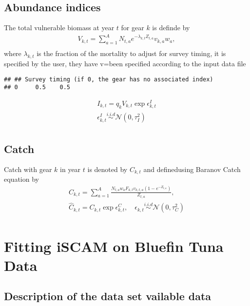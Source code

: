 \documentclass[a4paper]{article}\usepackage{graphicx, color}
\makeatletter
\newenvironment{kframe}{%
 \def\at@end@of@kframe{}%
 \ifinner\ifhmode%
  \def\at@end@of@kframe{\end{minipage}}%
  \begin{minipage}{\columnwidth}%
 \fi\fi%
 \def\FrameCommand##1{\hskip\@totalleftmargin \hskip-\fboxsep
 \colorbox{shadecolor}{##1}\hskip-\fboxsep
     \hskip-\linewidth \hskip-\@totalleftmargin \hskip\columnwidth}%
 \MakeFramed {\advance\hsize-\width
   \@totalleftmargin\z@ \linewidth\hsize
   \@setminipage}}%
 {\par\unskip\endMakeFramed%
 \at@end@of@kframe}
\newenvironment{knitrout}{}{} %
\makeatother
\begin{document}
\subsection{Abundance indices}
The total vulnerable biomass at year $t$ for gear $k$ is definde by
\begin{gather}
V_{k,t}=\sum_{a=1}^A N_{t,a} e^{-\lambda_{k,t} Z_{t,a}} v_{k,a} w_a,\\
\end{gather}
 where $\lambda_{k,t}$ is the fraction  of the mortality to adjust for
 survey  timing,  it  is  specified  by the  user,  they  have  v=been
 specified according to the input data file 
\begin{knitrout}
\color{fgcolor}\begin{kframe}
\begin{verbatim}
## ## Survey timing (if 0, the gear has no associated index)
## 0	 0.5	0.5
\end{verbatim}
\end{kframe}
\end{knitrout}

 
\begin{gather}
I_{k,t} = q_k V_{k,t} \exp{\epsilon_{k,t}^I}\\
\epsilon_{k,t}^I \overset{i.i.d}{\sim} \mathcal{N}(0,\tau_I^2)\\
\end{gather}
\subsection{Catch}
Catch  with  gear  $k$  in  year  $t$  is  denoted  by  $C_{k,t}$  and
definedusing Baranov Catch equation by
\begin{gather}
C_{k,t}   =   \sum_{a=1}^A   \frac{N_{t,a}   w_a   F_{k,t}   v_{k,t,a}
  (1-e^{-Z_{t,a}}) }{Z_{t,a}},\\
\hat{C}_{k,t} = C_{k,t} \exp{\epsilon_{k,t}^C}, \quad \epsilon_{k,t}\overset{i.i.d}{\sim}\mathcal{N}(0, \tau^2_C)\\
\end{gather}



\section{Fitting iSCAM on Bluefin Tuna Data}

\subsection{Description of the data set vailable data}
\end{document}
